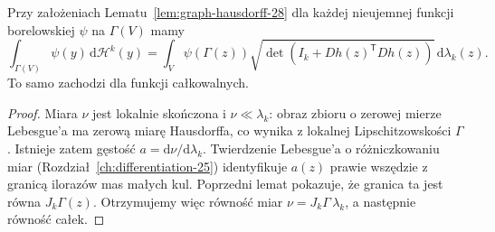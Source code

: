 \begin{twierdzenie}
\label{thm:graph-area-28}
Przy założeniach Lematu~\ref{lem:graph-hausdorff-28}
dla każdej nieujemnej funkcji borelowskiej
$\psi$ na $\Gamma(V)$ mamy
\[
 \int_{\Gamma(V)}\psi(y)\,\mathrm d\mathcal H^k(y)
 =\int_V\psi(\Gamma(z))
 \sqrt{\det(I_k+Dh(z)^{\mathsf T}Dh(z))}
 \,\mathrm d\lambda_k(z).
\]
To samo zachodzi dla funkcji całkowalnych.
\end{twierdzenie}
\begin{proof}
Miara $\nu$ jest lokalnie skończona i
$\nu\ll\lambda_k$: obraz zbioru o zerowej
mierze Lebesgue'a ma zerową miarę Hausdorffa,
co wynika z lokalnej Lipschitzowskości $\Gamma$.
Istnieje zatem gęstość $a=\mathrm d\nu/\mathrm d\lambda_k$.
Twierdzenie Lebesgue'a o różniczkowaniu miar
(Rozdział~\ref{ch:differentiation-25})
identyfikuje $a(z)$ prawie wszędzie z granicą
ilorazów mas małych kul. Poprzedni lemat
pokazuje, że granica ta jest równa $J_k\Gamma(z)$.
Otrzymujemy więc równość miar
$\nu=J_k\Gamma\,\lambda_k$, a następnie
równość całek.
\end{proof}

